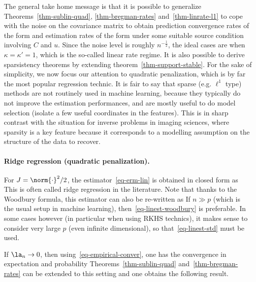 The general take home message is that it is possible to generalize Theorems~\ref{thm-sublin-quad}, \ref{thm-bregman-rates} and~\ref{thm-linrate-l1} to cope with the noise on the covariance matrix to obtain prediction convergence rates of the form 
and estimation rates of the form 
under some suitable source condition involving $C$ and $u$.
%
Since the noise level is roughly $n^{-\frac{1}{2}}$, the ideal cases are when $\kappa=\kappa'=1$, which is the so-called linear rate regime.  
%
It is also possible to derive sparsistency theorems by extending theorem~\ref{thm-support-stable}. For the sake of simplicity, we now focus our attention to quadratic penalization, which is by far the most popular regression technic. It is fair to say that sparse (e.g. $\ell^1$ type) methods are not routinely used in machine learning, because they typically do not improve the estimation performances, and are mostly useful to do model selection (isolate a few useful coordinates in the features). 
%
This is in sharp contrast with the situation for inverse problems in imaging sciences, where sparsity is a key feature because it corresponds to a modelling assumption on the structure of the data to recover. 

\paragraph{Ridge regression (quadratic penalization).}

For $J=\norm{\cdot}^2/2$, the estimator~\eqref{eq-erm-lin} is obtained in closed form as
This is often called ridge regression in the literature.
%
Note that thanks to the Woodbury formula, this estimator can also be re-written as
If $n \gg p$ (which is the usual setup in machine learning), then~\eqref{eq-linest-woodbury} is preferable. In some cases however (in particular when using RKHS technics), it makes sense to consider very large $p$ (even infinite dimensional), so that~\eqref{eq-linest-std} must be used. 

If $\la_n \rightarrow 0$, then using~\eqref{eq-empirical-conver}, one has the convergence in expectation and probability
Theorems~\ref{thm-sublin-quad} and~\ref{thm-bregman-rates} can be extended to this setting and one obtains the following result.

